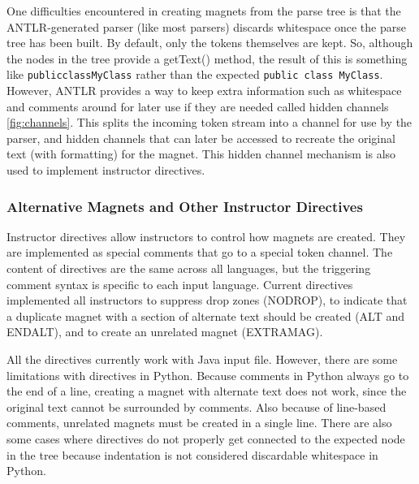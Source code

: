 \documentclass[letter,10pt]{article}
\begin{document}


One difficulties encountered in creating magnets from the parse tree 
is that the ANTLR-generated parser (like most parsers) discards 
whitespace once the parse tree has been built. By default, only the 
tokens themselves are kept. So, although the nodes in the tree 
provide a getText() method, the result of this is something 
like \verb~publicclassMyClass~ rather than the expected 
\verb~public class MyClass~. However, ANTLR provides a way to keep extra
information such as whitespace and comments around for later use if they 
are needed called hidden channels \ref{fig:channels}. This splits the 
incoming token stream into a channel for use by the parser, and hidden 
channels that can later be accessed to recreate the original text (with 
formatting) for the magnet. This hidden channel mechanism is also used 
to implement instructor directives.

\label{fig:channels}


\subsubsection{Alternative Magnets and Other Instructor Directives}

Instructor directives allow instructors to control how magnets are 
created. They are implemented as special comments that go to a 
special token channel. The content of directives are the same across all 
languages, but the triggering comment syntax is specific to each input 
language. Current directives implemented all instructors to suppress 
drop zones (NODROP), to indicate that a duplicate magnet with a section 
of alternate text should be created (ALT and ENDALT), and to create an 
unrelated magnet (EXTRAMAG).

All the directives currently work with Java input file. However, there 
are some limitations with directives in Python. Because comments in 
Python always go to the end of a line, creating a magnet with alternate 
text does not work, since the original text cannot be surrounded by 
comments. Also because of line-based comments, unrelated magnets must 
be created in a single line. There are also some cases where directives 
do not properly get connected to the expected node in the tree because 
indentation is not considered discardable whitespace in Python.
\end{document}
